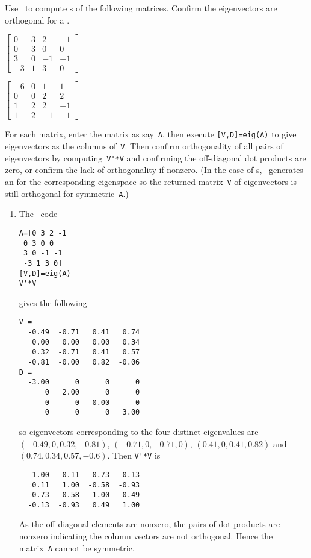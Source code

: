 \begin{example} \label{eg:4x4orthevec}
Use \script\ to compute s of the following matrices.
Confirm the eigenvectors are orthogonal for a .
\begin{parts}
\item \(\begin{bmatrix} 0 & 3 & 2 & -1
\\ 0 & 3 & 0 & 0
\\ 3 & 0 & -1 & -1
\\ -3 & 1 & 3 & 0 \end{bmatrix}\)
  
\item \(\begin{bmatrix} -6 & 0 & 1 & 1
\\ 0 & 0 & 2 & 2
\\ 1 & 2 & 2 & -1
\\ 1 & 2 & -1 & -1 \end{bmatrix}\)
\end{parts}
\begin{solution} 
For each matrix, enter the matrix as say~\verb|A|, then execute \verb|[V,D]=eig(A)| to give eigenvectors as the columns of~\verb|V|. 
Then confirm orthogonality of all pairs of eigenvectors by computing~\verb|V'*V| and confirming the off-diagonal dot products are zero, or confirm the lack of orthogonality if nonzero.
(In the case of s, \script\ generates an  for the corresponding eigenspace so the returned matrix~\verb|V| of eigenvectors is still orthogonal for symmetric~\verb|A|.)
\begin{enumerate}
\item The \script\ code 
\setbox\ajrqrbox\hbox{}%
\marginpar{\usebox{\ajrqrbox}}%
\begin{verbatim}
A=[0 3 2 -1
 0 3 0 0
 3 0 -1 -1
 -3 1 3 0]
[V,D]=eig(A)
V'*V
\end{verbatim}
gives the following \twodp
\begin{verbatim}
V =
  -0.49  -0.71   0.41   0.74
   0.00   0.00   0.00   0.34
   0.32  -0.71   0.41   0.57
  -0.81  -0.00   0.82  -0.06
D =
  -3.00      0      0      0
      0   2.00      0      0
      0      0   0.00      0
      0      0      0   3.00
\end{verbatim}
so eigenvectors corresponding to the four distinct eigenvalues are
\sloppy
\((-0.49,0,0.32,-0.81)\), \((-0.71,0,-0.71,0)\), \((0.41,0,0.41,0.82)\) and \((0.74,0.34,0.57,-0.6)\).
Then \verb|V'*V| is \twodp
\begin{verbatim}
   1.00   0.11  -0.73  -0.13
   0.11   1.00  -0.58  -0.93
  -0.73  -0.58   1.00   0.49
  -0.13  -0.93   0.49   1.00
\end{verbatim}
As the off-diagonal elements are nonzero,  the pairs of dot products are nonzero indicating the column vectors are not orthogonal.  
Hence the matrix~\verb|A| cannot be symmetric.


\end{enumerate}
\end{solution}
\end{example}
